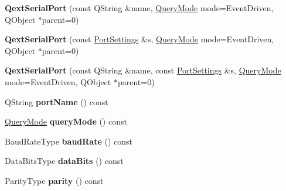 \begin{DoxyCompactItemize}
\item 
\mbox{\label{class_qext_serial_port_ab0376896b79bb9dc099bf102f01e5afa}} 
{\bfseries Qext\+Serial\+Port} (const Q\+String \&name, \mbox{\hyperlink{class_qext_serial_port_a269e1f3656224a10c321bd70ab89cf64}{Query\+Mode}} mode=Event\+Driven, Q\+Object $\ast$parent=0)
\item 
\mbox{\label{class_qext_serial_port_a990ab7ac41bbfe2e9ec2e247145bd49e}} 
{\bfseries Qext\+Serial\+Port} (const \mbox{\hyperlink{struct_port_settings}{Port\+Settings}} \&s, \mbox{\hyperlink{class_qext_serial_port_a269e1f3656224a10c321bd70ab89cf64}{Query\+Mode}} mode=Event\+Driven, Q\+Object $\ast$parent=0)
\item 
\mbox{\label{class_qext_serial_port_a31c6182fc721b775231c5cc4b1ab98de}} 
{\bfseries Qext\+Serial\+Port} (const Q\+String \&name, const \mbox{\hyperlink{struct_port_settings}{Port\+Settings}} \&s, \mbox{\hyperlink{class_qext_serial_port_a269e1f3656224a10c321bd70ab89cf64}{Query\+Mode}} mode=Event\+Driven, Q\+Object $\ast$parent=0)
\item 
\mbox{\label{class_qext_serial_port_a4e2de47edc32d7e5c6827c55534e23da}} 
Q\+String {\bfseries port\+Name} () const
\item 
\mbox{\label{class_qext_serial_port_a2a89b9bd0be1a9e0f817acd77f11842f}} 
\mbox{\hyperlink{class_qext_serial_port_a269e1f3656224a10c321bd70ab89cf64}{Query\+Mode}} {\bfseries query\+Mode} () const
\item 
\mbox{\label{class_qext_serial_port_aca6d359f346c3938ee13fef282fc4844}} 
Baud\+Rate\+Type {\bfseries baud\+Rate} () const
\item 
\mbox{\label{class_qext_serial_port_a8f1822355b63a38924d4f3c9e8b6ae8a}} 
Data\+Bits\+Type {\bfseries data\+Bits} () const
\item 
\mbox{\label{class_qext_serial_port_adc80d1c0705ed88b6472883937ad3c20}} 
Parity\+Type {\bfseries parity} () const
\item 
\mbox{\label{class_qext_serial_port_ac555d2bc67a6f1a4f389c54f3a3d5f60}} 

\end{DoxyCompactItemize}
